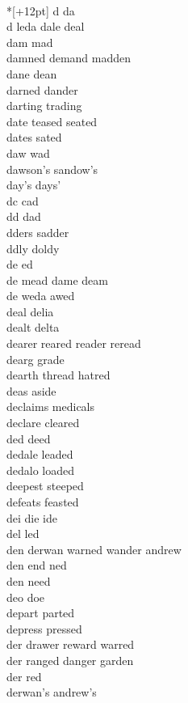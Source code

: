 \vspace{14pt}
\noindent\notextbf{\LargeD}\\*[+12pt]
d da \\
d leda dale deal   \\
dam mad\\
damned demand madden\\
dane dean\\
darned dander\\
darting trading\\
date teased seated  \\
dates sated\\
daw wad\\
dawson's sandow's\\
day's days'\\
dc cad \\
dd dad \\
dders sadder \\
ddly doldy \\
de ed\\
de mead dame deam  \\
de weda awed  \\
deal delia \\
dealt delta\\
dearer reared reader reread\\
dearg grade\\
dearth thread hatred\\
deas aside \\
declaims medicals\\
declare cleared\\
ded deed \\
dedale leaded\\
dedalo loaded\\
deepest steeped\\
defeats feasted\\
dei die ide\\
del led\\
den derwan warned wander andrew   \\
den end ned\\
den need \\
deo doe\\
depart parted\\
depress pressed\\
der drawer reward warred   \\
der ranged danger garden   \\
der red\\
derwan's andrew's\\
